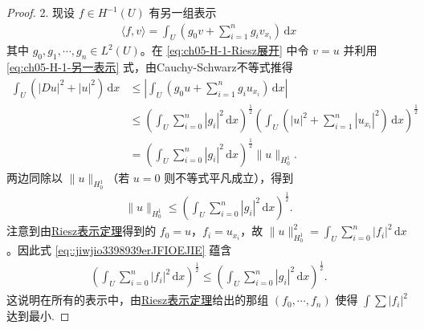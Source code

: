 \documentclass[../../main.tex]{subfiles}
\begin{document}
\begin{proof}
2.
现设 $f\in H^{-1}(U)$ 有另一组表示
\begin{align}\label{eq:ch05-H-1-另一表示}
\langle f,v\rangle=\int_{U}(g_0v+\sum_{i=1}^{n}g_iv_{x_i})\,\mathrm{d}x
\end{align}
其中 $g_0,g_1,\cdots,g_n\in L^2(U)$。在 \eqref{eq:ch05-H-1-Riesz展开} 中令 $v=u$ 并利用 \eqref{eq:ch05-H-1-另一表示} 式，由Cauchy-Schwarz不等式推得
\begin{align*}
\int_{U}(|Du|^2+|u|^2)\,\mathrm{d}x
&\leqslant \left|\int_{U}(g_0u+\sum_{i=1}^{n}g_iu_{x_i})\,\mathrm{d}x\right|\\
&\leqslant \left(\int_{U}\sum_{i=0}^{n}|g_i|^2\,\mathrm{d}x\right)^{\frac{1}{2}}\left(\int_{U}(|u|^2+\sum_{i=1}^{n}|u_{x_i}|^2)\,\mathrm{d}x\right)^{\frac{1}{2}}\\
&=\left(\int_{U}\sum_{i=0}^{n}|g_i|^2\,\mathrm{d}x\right)^{\frac{1}{2}}\|u\|_{H_0^1}.
\end{align*}
两边同除以 $\|u\|_{H_0^1}$（若 $u=0$ 则不等式平凡成立），得到
\begin{align*}
\|u\|_{H_0^1}\leqslant\left(\int_{U}\sum_{i=0}^{n}|g_i|^2\,\mathrm{d}x\right)^{\frac{1}{2}}.
\end{align*}
注意到由\hyperref[Functional Analysis-theorem:Riesz表示定理(Hilbert空间)]{Riesz表示定理}得到的 $f_0=u$，$f_i=u_{x_i}$，故 $\|u\|_{H_0^1}^2=\int_{U}\sum_{i=0}^{n}|f_i|^2\,\mathrm{d}x$。因此式 \eqref{eq::jiwjio3398939erJFIOEJIE} 蕴含
\begin{align}\label{eq:ch05-H-1-极小性}
\left(\int_{U}\sum_{i=0}^{n}|f_i|^2\,\mathrm{d}x\right)^{\frac{1}{2}}\leqslant\left(\int_{U}\sum_{i=0}^{n}|g_i|^2\,\mathrm{d}x\right)^{\frac{1}{2}}.
\end{align}
这说明在所有的表示中，由\hyperref[Functional Analysis-theorem:Riesz表示定理(Hilbert空间)]{Riesz表示定理}给出的那组 $(f_0,\cdots,f_n)$ 使得 $\int \sum |f_i|^2$ 达到最小.


\end{proof}
\end{document}
